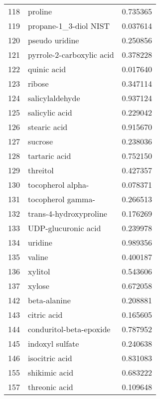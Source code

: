 \begin{tabular}{llr}
118 & proline & 0.735365 \\
119 & propane-1_3-diol NIST & 0.037614 \\
120 & pseudo uridine & 0.250856 \\
121 & pyrrole-2-carboxylic acid & 0.378228 \\
122 & quinic acid & 0.017640 \\
123 & ribose & 0.347114 \\
124 & salicylaldehyde & 0.937124 \\
125 & salicylic acid & 0.229042 \\
126 & stearic acid & 0.915670 \\
127 & sucrose & 0.238036 \\
128 & tartaric acid & 0.752150 \\
129 & threitol & 0.427357 \\
130 & tocopherol alpha- & 0.078371 \\
131 & tocopherol gamma- & 0.266513 \\
132 & trans-4-hydroxyproline & 0.176269 \\
133 & UDP-glucuronic acid & 0.239978 \\
134 & uridine & 0.989356 \\
135 & valine & 0.400187 \\
136 & xylitol & 0.543606 \\
137 & xylose & 0.672058 \\
142 & beta-alanine & 0.208881 \\
143 & citric acid & 0.165605 \\
144 & conduritol-beta-epoxide & 0.787952 \\
145 & indoxyl sulfate & 0.240638 \\
146 & isocitric acid & 0.831083 \\
155 & shikimic acid & 0.683222 \\
157 & threonic acid & 0.109648 \\
\bottomrule
\end{tabular}
